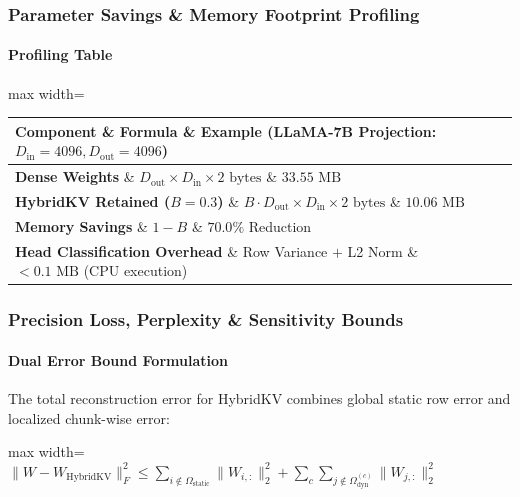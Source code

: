 \subsubsection*{Parameter Savings \& Memory Footprint Profiling}

\paragraph{Profiling Table}

\begin{center}
\begin{adjustbox}{max width=\columnwidth}
\renewcommand{\arraystretch}{1.2}
\begin{tabular}{lll}
\toprule
Component \& Formula \& Example (LLaMA-7B Projection: $D_{\text{in}}=4096, D_{\text{out}}=4096$) \\
\midrule
\textbf{Dense Weights} \& $D_{\text{out}} \times D_{\text{in}} \times 2 \text{ bytes}$ \& $33.55 \text{ MB}$ \\
\textbf{HybridKV Retained ($B=0.3$)} \& $B \cdot D_{\text{out}} \times D_{\text{in}} \times 2 \text{ bytes}$ \& $10.06 \text{ MB}$ \\
\textbf{Memory Savings} \& $1 - B$ \& $\mathbf{70.0\%}$ Reduction \\
\textbf{Head Classification Overhead} \& Row Variance $+$ L2 Norm \& $< 0.1 \text{ MB}$ (CPU execution) \\

\bottomrule
\end{tabular}
\end{adjustbox}
\end{center}

\subsubsection*{Precision Loss, Perplexity \& Sensitivity Bounds}

\paragraph{Dual Error Bound Formulation}

The total reconstruction error for HybridKV combines global static row error and localized chunk-wise error:

\begin{center}
\begin{adjustbox}{max width=\columnwidth}
$\displaystyle
\| W - W_{\text{HybridKV}} \|_F^2 \le \sum_{i \notin \Omega_{\text{static}}} \| W_{i, :} \|_2^2 + \sum_{c} \sum_{j \notin \Omega_{\text{dyn}}^{(c)}} \| W_{j, :} \|_2^2
$
\end{adjustbox}
\end{center}

